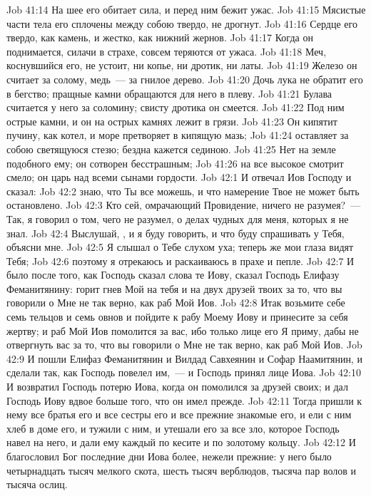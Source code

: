 \vs Job 41:14 На шее его обитает сила, и перед ним бежит ужас.
\vs Job 41:15 Мясистые части тела его сплочены между собою твердо, не дрогнут.
\vs Job 41:16 Сердце его твердо, как камень, и жестко, как нижний жернов.
\vs Job 41:17 Когда он поднимается, силачи в страхе, совсем теряются от ужаса.
\vs Job 41:18 Меч, коснувшийся его, не устоит, ни копье, ни дротик, ни латы.
\vs Job 41:19 Железо он считает за солому, медь~--- за гнилое дерево.
\vs Job 41:20 Дочь лука не обратит его в бегство; пращные камни обращаются для него в плеву.
\vs Job 41:21 Булава считается у него за соломину; свисту дротика он смеется.
\vs Job 41:22 Под ним острые камни, и он на острых камнях лежит в грязи.
\vs Job 41:23 Он кипятит пучину, как котел, и море претворяет в кипящую мазь;
\vs Job 41:24 оставляет за собою светящуюся стезю; бездна кажется сединою.
\vs Job 41:25 Нет на земле подобного ему; он сотворен бесстрашным;
\vs Job 41:26 на все высокое смотрит смело; он царь над всеми сынами гордости.
\vs Job 42:1 И отвечал Иов Господу и сказал:
\vs Job 42:2 знаю, что Ты все можешь, и что намерение Твое не может быть остановлено.
\vs Job 42:3 Кто сей, омрачающий Провидение, ничего не разумея?~--- Так, я говорил о том, чего не разумел, о делах чудных для меня, которых я не знал.
\vs Job 42:4 Выслушай, , и я буду говорить, и что буду спрашивать у Тебя, объясни мне.
\vs Job 42:5 Я слышал о Тебе слухом уха; теперь же мои глаза видят Тебя;
\vs Job 42:6 поэтому я отрекаюсь и раскаиваюсь в прахе и пепле.
\rsbpar\vs Job 42:7 И было после того, как Господь сказал слова те Иову, сказал Господь Елифазу Феманитянину: горит гнев Мой на тебя и на двух друзей твоих за то, что вы говорили о Мне не так верно, как раб Мой Иов.
\vs Job 42:8 Итак возьмите себе семь тельцов и семь овнов и пойдите к рабу Моему Иову и принесите за себя жертву; и раб Мой Иов помолится за вас, ибо только лице его Я приму, дабы не отвергнуть вас за то, что вы говорили о Мне не так верно, как раб Мой Иов.
\vs Job 42:9 И пошли Елифаз Феманитянин и Вилдад Савхеянин и Софар Наамитянин, и сделали так, как Господь повелел им,~--- и Господь принял лице Иова.
\rsbpar\vs Job 42:10 И возвратил Господь потерю Иова, когда он помолился за друзей своих; и дал Господь Иову вдвое больше того, что он имел прежде.
\vs Job 42:11 Тогда пришли к нему все братья его и все сестры его и все прежние знакомые его, и ели с ним хлеб в доме его, и тужили с ним, и утешали его за все зло, которое Господь навел на него, и дали ему каждый по кесите и по золотому кольцу.
\rsbpar\vs Job 42:12 И благословил Бог последние дни Иова более, нежели прежние: у него было четырнадцать тысяч мелкого скота, шесть тысяч верблюдов, тысяча пар волов и тысяча ослиц.
